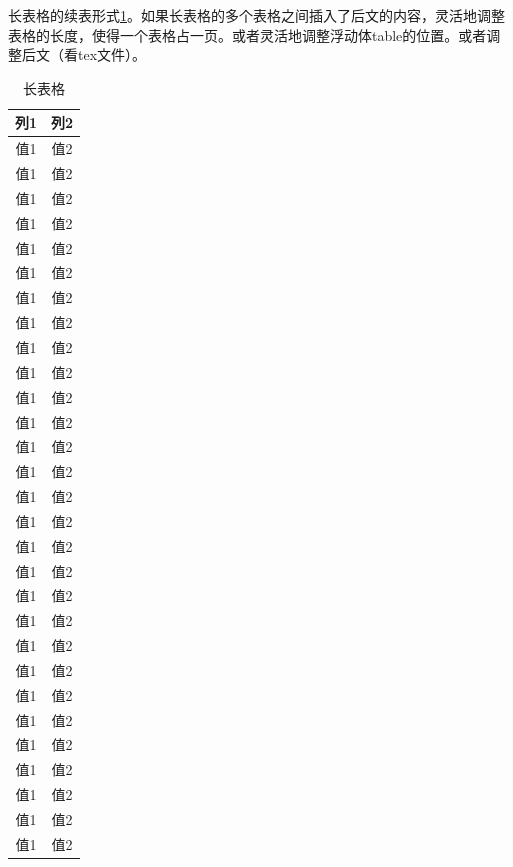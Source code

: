 \documentclass{csuthesis}
\begin{document}
    长表格的续表形式\ref{tab:long_table1}。如果长表格的多个表格之间插入了后文的内容，灵活地调整表格的长度，使得一个表格占一页。或者灵活地调整浮动体table的位置。或者调整后文（看tex文件）。
    \begin{table}[!t]
        \centering
        \caption{长表格}
        \label{tab:long_table1}
        \begin{tabular}{c c}
            \toprule[2pt]
            列1 & 列2 \\
            \midrule
            值1 & 值2 \\
            值1 & 值2 \\
            值1 & 值2 \\
            值1 & 值2 \\
            值1 & 值2 \\
            值1 & 值2 \\
            值1 & 值2 \\
            值1 & 值2 \\
            值1 & 值2 \\
            值1 & 值2 \\
            值1 & 值2 \\
            值1 & 值2 \\
            值1 & 值2 \\
            值1 & 值2 \\
            值1 & 值2 \\
            值1 & 值2 \\
            值1 & 值2 \\
            值1 & 值2 \\
            值1 & 值2 \\
            值1 & 值2 \\
            值1 & 值2 \\
            值1 & 值2 \\
            值1 & 值2 \\
            值1 & 值2 \\
            值1 & 值2 \\
            值1 & 值2 \\
            值1 & 值2 \\
            值1 & 值2 \\
            值1 & 值2 \\
            \bottomrule[2pt]
        \end{tabular}
    \end{table}

    
\end{document}
